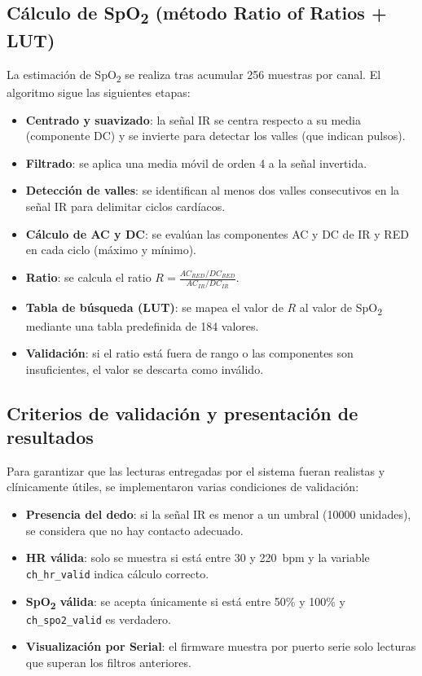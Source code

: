 \subsection{Cálculo de SpO\textsubscript{2} (método Ratio of Ratios + LUT)}

La estimación de SpO\textsubscript{2} se realiza tras acumular 256 muestras por canal. El algoritmo sigue las siguientes etapas:

\begin{itemize}
    \item \textbf{Centrado y suavizado}: la señal IR se centra respecto a su media (componente DC) y se invierte para detectar los valles (que indican pulsos).
    \item \textbf{Filtrado}: se aplica una media móvil de orden 4 a la señal invertida.
    \item \textbf{Detección de valles}: se identifican al menos dos valles consecutivos en la señal IR para delimitar ciclos cardíacos.
    \item \textbf{Cálculo de AC y DC}: se evalúan las componentes AC y DC de IR y RED en cada ciclo (máximo y mínimo).
    \item \textbf{Ratio}: se calcula el ratio \( R = \frac{AC_{RED}/DC_{RED}}{AC_{IR}/DC_{IR}} \).
    \item \textbf{Tabla de búsqueda (LUT)}: se mapea el valor de \( R \) al valor de SpO\textsubscript{2} mediante una tabla predefinida de 184 valores.
    \item \textbf{Validación}: si el ratio está fuera de rango o las componentes son insuficientes, el valor se descarta como inválido.
\end{itemize}

\subsection{Criterios de validación y presentación de resultados}

Para garantizar que las lecturas entregadas por el sistema fueran realistas y clínicamente útiles, se implementaron varias condiciones de validación:

\begin{itemize}
    \item \textbf{Presencia del dedo}: si la señal IR es menor a un umbral (10000 unidades), se considera que no hay contacto adecuado.
    \item \textbf{HR válida}: solo se muestra si está entre 30 y 220~bpm y la variable \texttt{ch\_hr\_valid} indica cálculo correcto.
    \item \textbf{SpO\textsubscript{2} válida}: se acepta únicamente si está entre 50\% y 100\% y \texttt{ch\_spo2\_valid} es verdadero.
    \item \textbf{Visualización por Serial}: el firmware muestra por puerto serie solo lecturas que superan los filtros anteriores.
\end{itemize}




